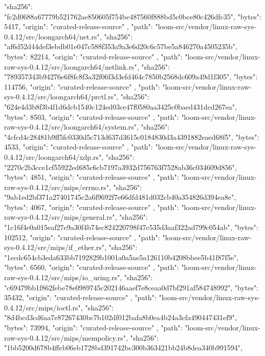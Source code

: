 {{      "sha256": "fc2d0688a67779b521762ae850605f754be487560f888bd5c0bce80c426dfc35",
      "bytes": 5417,
      "origin": "curated-release-source"
    },
    {
      "path": "loom-src/vendor/linux-raw-sys-0.4.12/src/loongarch64/net.rs",
      "sha256": "af6d52d44def3ebdb01e047c588f353a9a3e6d20c6c57be5a846270a4505235b",
      "bytes": 82214,
      "origin": "curated-release-source"
    },
    {
      "path": "loom-src/vendor/linux-raw-sys-0.4.12/src/loongarch64/netlink.rs",
      "sha256": "789357343b94276e6f8fc8f3a32f06f3d3efd464c7850b2568dc609a49d1f305",
      "bytes": 114756,
      "origin": "curated-release-source"
    },
    {
      "path": "loom-src/vendor/linux-raw-sys-0.4.12/src/loongarch64/prctl.rs",
      "sha256": "624e4d3b8f3b4f1d6dcb1540c124ed03ce47f0580aa3425c0baed431dcd267ea",
      "bytes": 8503,
      "origin": "curated-release-source"
    },
    {
      "path": "loom-src/vendor/linux-raw-sys-0.4.12/src/loongarch64/system.rs",
      "sha256": "4cfcd4c28481b9ff5fc0330d5c713d637d3615c0184830d3a4391882eaed68f5",
      "bytes": 4533,
      "origin": "curated-release-source"
    },
    {
      "path": "loom-src/vendor/linux-raw-sys-0.4.12/src/loongarch64/xdp.rs",
      "sha256": "2270c2b3cce1cf55922ed685c6cb7197a3932d756763f7528ab36c034609d856",
      "bytes": 4851,
      "origin": "curated-release-source"
    },
    {
      "path": "loom-src/vendor/linux-raw-sys-0.4.12/src/mips/errno.rs",
      "sha256": "9ab1ed2bf371a27401745c2a6f9692f7e66dfd481d032cb40a354826d394ea8e",
      "bytes": 4067,
      "origin": "curated-release-source"
    },
    {
      "path": "loom-src/vendor/linux-raw-sys-0.4.12/src/mips/general.rs",
      "sha256": "1c16f4e0a015eaf27e9a30f4b74ec824220798f47c535d3aaf322ad799c054ab",
      "bytes": 102512,
      "origin": "curated-release-source"
    },
    {
      "path": "loom-src/vendor/linux-raw-sys-0.4.12/src/mips/if_ether.rs",
      "sha256": "1ecdc654cb3eda633bb7192829b1001a0a5ae5a126110b4208bbee5b41f87f5e",
      "bytes": 6560,
      "origin": "curated-release-source"
    },
    {
      "path": "loom-src/vendor/linux-raw-sys-0.4.12/src/mips/io_uring.rs",
      "sha256": "c69479bb1f862febe78e0989745c202146aaef7e8ceaa0d7bf291af584748992",
      "bytes": 35432,
      "origin": "curated-release-source"
    },
    {
      "path": "loom-src/vendor/linux-raw-sys-0.4.12/src/mips/ioctl.rs",
      "sha256": "8d4bcd3cd6aa7e87267430bc7b102df012bafa8b0ea4b24a3cfa490447431ef9",
      "bytes": 73994,
      "origin": "curated-release-source"
    },
    {
      "path": "loom-src/vendor/linux-raw-sys-0.4.12/src/mips/mempolicy.rs",
      "sha256": "1bb5200d678b4ffeb06eb1728bd391742bc300b363421bb24b8dea340b991594",
}}

